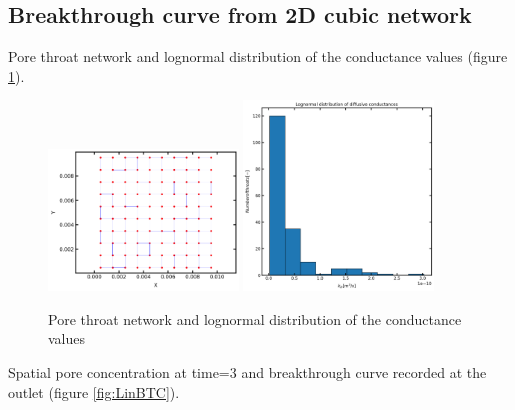 \documentclass{article}
\begin{document}
\subsection{Breakthrough curve from 2D cubic network}
Pore throat network and lognormal distribution of the conductance values (figure \ref{fig:2DstrctureCond}).
\begin{figure}[htbp!]
    \centering
    \includegraphics[width=0.45\textwidth]{images/fromOpenPNM/2DnetworkStructure10x10.png}
    \hspace{0.05\textwidth}
    \includegraphics[width=0.45\textwidth]{images/fromOpenPNM/LognormalDistCond.png}
    \caption{Pore throat network and lognormal distribution of the conductance values}
    \label{fig:2DstrctureCond}
\end{figure}
Spatial pore concentration at time=3 and breakthrough curve recorded at the outlet (figure \ref{fig:LinBTC}).
\end{document}
